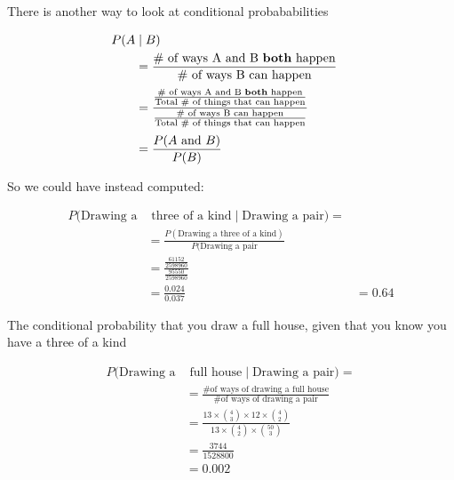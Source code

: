 %
\begin{frame}

There is another way to look at conditional probababilities

\begin{align*}
P(A & \mid B) & \\
%
&= \frac{\text{\# of ways A and B \textbf{both} happen}}{\text{\#
of ways B can happen}} \\[0.5ex]
%
&= \frac{\frac{\text{\# of ways A and B \textbf{both} happen}}{\text{Total \# of
things that can happen}}}{\frac{\text{\# of ways B can happen}}{\text{Total \# of
things that can happen}}} \\[0.5ex]
%
&= \frac{P(A \text{ and } B)}{P(B)}
\end{align*}

\end{frame}
%

%
\begin{frame}

So we could have instead computed:

\begin{align*}
P(\text{Drawing a} & \text{ three of a kind} \mid \text{Drawing a pair}) = \\
%
&= \frac{P(\text{Drawing a three of a kind})}{P(\text{Drawing a pair}} \\
%
&= \frac{\frac{61152}{2598960}}{\frac{95550}{2598960}} \\
%
&= \frac{0.024}{0.037}
%
&= 0.64
\end{align*}

\end{frame}
%

%
\begin{frame}

The conditional probability that you draw a full house, given that you know you
have a three of a kind

\begin{align*}
P(\text{Drawing a} & \text{ full house} \mid \text{Drawing a pair}) = \\
%
&= \frac{\text{\# of ways of drawing a full house}}{\text{\# of ways of drawing
a pair}} \\
%
&= \frac{ 13 \times {{4}\choose{3}} \times 12 \times {{4}\choose{2}} } {13
\times {{4}\choose{2}} \times {{50}\choose{3}}} \\
%
%
&= \frac{3744}{1528800} \\
%
&= 0.002
\end{align*}

\end{frame}
